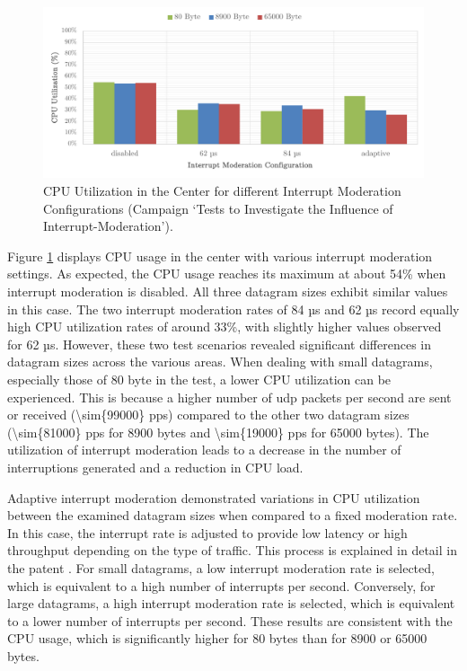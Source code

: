 \begin{figure}[h]
    \centering
    \includegraphics[width=1\linewidth]{figures/reliability/ihawk/diagr11.pdf}
    \caption{\ac{CPU} Utilization in the Center for different Interrupt Moderation Configurations (Campaign `Tests to Investigate the Influence of Interrupt-Moderation').}
    \label{fig:diagr11CPU}
\end{figure}

Figure \ref{fig:diagr11CPU} displays \ac{CPU} usage in the center with various interrupt moderation settings. As expected, the \ac{CPU} usage reaches its maximum at about 54\% when interrupt moderation is disabled. All three datagram sizes exhibit similar values in this case. The two interrupt moderation rates of 84 µs and 62 µs record equally high \ac{CPU} utilization rates of around 33\%, with slightly higher values observed for 62 µs. However, these two test scenarios revealed significant differences in datagram sizes across the various areas. When dealing with small datagrams, especially those of 80 byte in the test, a lower \ac{CPU} utilization can be experienced. This is because a higher number of \ac{udp} packets per second are sent or received (\num{\sim{99000}} pps) compared to the other two datagram sizes (\num{\sim{81000}} pps for 8900 bytes and \num{\sim{19000}} pps for 65000 bytes). The utilization of interrupt moderation leads to a decrease in the number of interruptions generated and a reduction in \ac{CPU} load.

Adaptive interrupt moderation demonstrated variations in \ac{CPU} utilization between the examined datagram sizes when compared to a fixed moderation rate. In this case, the interrupt rate is adjusted to provide low latency or high throughput depending on the type of traffic. This process is explained in detail in the patent \cite{intermod04}. For small datagrams, a low interrupt moderation rate is selected, which is equivalent to a high number of interrupts per second. Conversely, for large datagrams, a high interrupt moderation rate is selected, which is equivalent to a lower number of interrupts per second. These results are consistent with the \ac{CPU} usage, which is significantly higher for 80 bytes than for 8900 or 65000 bytes.

